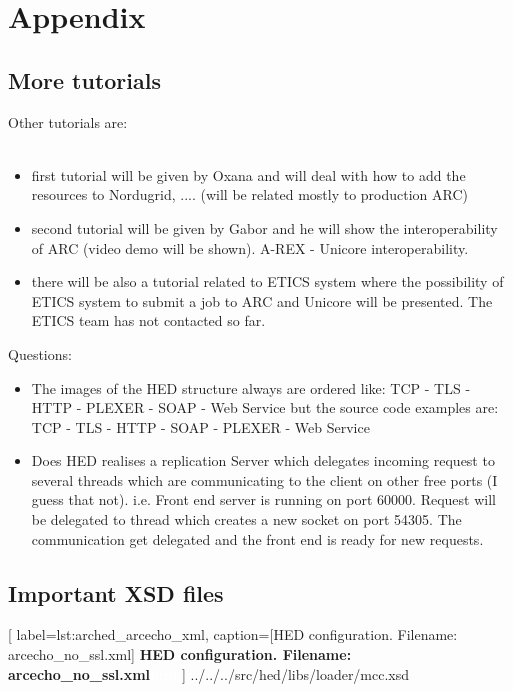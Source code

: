 \chapter{Appendix}

\section{More tutorials}

Other tutorials are:\\
\\
\begin{itemize}
 \item first tutorial will be given by Oxana and will deal with how to add the 
resources to Nordugrid, .... (will be related mostly to production ARC)
 \item second tutorial will be given by Gabor and he will show the 
interoperability of ARC (video demo will be shown). A-REX - Unicore 
interoperability.
 \item there will be also a tutorial related to ETICS system where the 
possibility of ETICS system to submit a job to ARC and Unicore will be 
presented. The ETICS team has not contacted so far.
\end{itemize}

Questions:
\begin{itemize}
 \item The images of the HED structure always are ordered like: TCP - TLS - HTTP - PLEXER - SOAP - Web Service   but the source code examples are: TCP - TLS - HTTP - SOAP - PLEXER - Web Service
 \item Does HED realises a replication Server which delegates incoming request to several threads which are communicating to the client on other free ports (I guess that not). i.e.  Front end server is running on port 60000. Request will be delegated to thread which creates a new socket on port 54305. The communication get delegated and the front end is ready for new requests.
\end{itemize}


\section{Important XSD files}

	[
	label=lst:arched_arcecho_xml,
	caption={[HED configuration. Filename: arcecho\_no\_ssl.xml]
	\textbf{HED configuration. Filename: arcecho\_no\_ssl.xml\textcolor{white}{hmf}}}
	]
{../../../src/hed/libs/loader/mcc.xsd}


